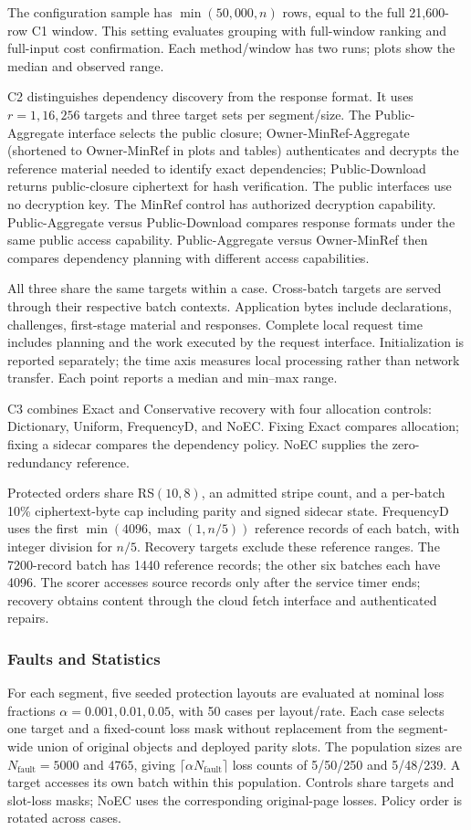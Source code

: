 \documentclass[10pt,journal]{IEEEtran}
\begin{document}
The configuration
sample has $\min(50{,}000,n)$ rows, equal to the full 21,600-row C1 window.
This setting evaluates grouping with full-window ranking and full-input
cost confirmation. Each method/window has two runs; plots show the median
and observed range.

C2 distinguishes dependency discovery from the response format. It uses
$r=1,16,256$ targets and three target sets per segment/size. The
Public-Aggregate interface selects the public closure; Owner-MinRef-Aggregate
(shortened to Owner-MinRef in plots and tables) authenticates and decrypts
the reference material needed to identify exact dependencies; Public-Download
returns public-closure ciphertext for hash verification. The public interfaces use no decryption key. The MinRef
control has authorized decryption capability. Public-Aggregate versus Public-Download compares response formats under
the same public access capability. Public-Aggregate versus Owner-MinRef then
compares dependency planning with different access capabilities.

All three share the same
targets within a case. Cross-batch targets are served through their respective
batch contexts. Application bytes include declarations, challenges,
first-stage material and responses. Complete local request time includes
planning and the work executed by the request interface. Initialization
is reported separately; the time axis measures local processing rather
than network transfer. Each point reports a median and min--max range.

C3 combines Exact and Conservative recovery with four allocation controls:
Dictionary, Uniform, FrequencyD, and NoEC. Fixing Exact compares allocation;
fixing a sidecar compares the dependency policy. NoEC supplies the
zero-redundancy reference.

Protected orders share RS$(10,8)$, an admitted stripe count, and a per-batch
10\% ciphertext-byte cap including parity and signed sidecar state.
FrequencyD uses the first $\min(4096,\max(1,n/5))$ reference records of
each batch, with integer division for $n/5$. Recovery targets exclude these
reference ranges. The 7200-record batch has 1440 reference records; the
other six batches each have 4096. The scorer accesses source records only
after the service timer ends; recovery obtains content through the cloud
fetch interface and authenticated repairs.

\subsubsection{Faults and Statistics}
For each segment, five seeded protection layouts are evaluated at nominal
loss fractions $\alpha=0.001,0.01,0.05$, with 50 cases per layout/rate.
Each case selects one target and a fixed-count loss mask without replacement
from the segment-wide union of original objects and deployed parity slots.
The population sizes are $N_{\mathrm{fault}}=5000$ and $4765$, giving $\lceil\alpha N_{\mathrm{fault}}\rceil$
loss counts of 5/50/250 and 5/48/239. A target accesses its own batch
within this population. Controls share targets and slot-loss masks; NoEC
uses the corresponding original-page losses. Policy order is rotated across cases.
\end{document}
